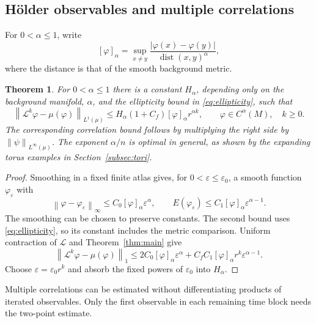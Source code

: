 \documentclass[11pt,reqno]{amsart}
\theoremstyle{plain}
\newtheorem{theorem}{Theorem}[section]
\theoremstyle{definition}
\theoremstyle{remark}
\newcommand{\Lop}{\mathcal L}
\newcommand{\norm}[1]{\left\lVert #1\right\rVert}
\DeclareMathOperator{\dist}{dist}
\numberwithin{equation}{section}
\begin{document}
\subsection{H\"older observables and multiple correlations}

For $0<\alpha\le1$, write
\[
 [\varphi]_\alpha=\sup_{x\ne y}
 \frac{|\varphi(x)-\varphi(y)|}{\dist(x,y)^\alpha},
\]
where the distance is that of the smooth background metric.

\begin{theorem}\label{thm:holder}
For $0<\alpha\le1$ there is a constant $H_\alpha$, depending only on the background manifold, $\alpha$, and the ellipticity bound in \eqref{eq:ellipticity}, such that
\begin{equation}\label{eq:holder-decay}
 \norm{\Lop^k\varphi-\mu(\varphi)}_{L^1(\mu)}
 \le H_\alpha(1+C_f)[\varphi]_\alpha r^{\alpha k},
 \qquad \varphi\in C^\alpha(M),\quad k\ge0.
\end{equation}
The corresponding correlation bound follows by multiplying the right side by $\norm{\psi}_{L^\infty(\mu)}$. The exponent $\alpha/n$ is optimal in general, as shown by the expanding torus examples in Section~\ref{subsec:tori}.
\end{theorem}

\begin{proof}
Smoothing in a fixed finite atlas gives, for $0<\varepsilon\le\varepsilon_0$, a smooth function $\varphi_\varepsilon$ with
\[
 \norm{\varphi-\varphi_\varepsilon}_\infty
 \le C_0[\varphi]_\alpha\varepsilon^\alpha,
 \qquad
 E(\varphi_\varepsilon)
 \le C_1[\varphi]_\alpha\varepsilon^{\alpha-1}.
\]
The smoothing can be chosen to preserve constants. The second bound uses \eqref{eq:ellipticity}, so its constant includes the metric comparison. Uniform contraction of $\Lop$ and Theorem~\ref{thm:main} give
\[
 \norm{\Lop^k\varphi-\mu(\varphi)}_1
 \le2C_0[\varphi]_\alpha\varepsilon^\alpha
 +C_fC_1[\varphi]_\alpha r^k\varepsilon^{\alpha-1}.
\]
Choose $\varepsilon=\varepsilon_0r^k$ and absorb the fixed powers of $\varepsilon_0$ into $H_\alpha$.
\end{proof}

Multiple correlations can be estimated without differentiating products of iterated observables. Only the first observable in each remaining time block needs the two-point estimate.
\end{document}
